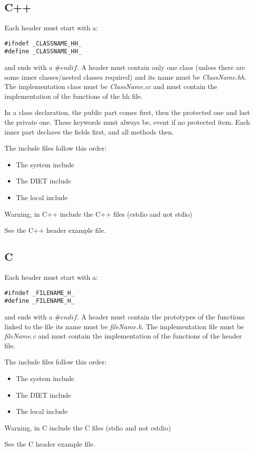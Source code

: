 \documentclass{article}
\begin{document}
\subsection{C++}
Each header must start with a:
\begin{verbatim}
#ifndef _CLASSNAME_HH_ 
#define _CLASSNAME_HH_ 
\end{verbatim}
and ends with a $\#endif$.
A header must contain only one class (unless there are some inner classes/nested
 classes required) and its name must be \textit{ClassName.hh}. The implementation
 class must be \textit{ClassName.cc} and must contain the implementation of the
 functions of the hh file.

In a class declaration, the public part comes first, then the protected one and 
last the private one. These keywords must always be, event if no protected item.
Each inner part declares the fields first, and all methods then.

The include files follow this order:
\begin{itemize}
\item The system include
\item The DIET include
\item The local include
\end{itemize}
Warning, in C++ include the C++ files (cstdio and not stdio)

See the C++ header example file.

\subsection{C}
Each header must start with a:
\begin{verbatim}
#ifndef _FILENAME_H_ 
#define _FILENAME_H_ 
\end{verbatim}
and ends with a $\#endif$.
A header must contain the prototypes of the functions linked to the file
 its name must be \textit{fileName.h}. The implementation
 file must be \textit{fileName.c} and must contain the implementation of the
 functions of the header file.


The include files follow this order:
\begin{itemize}
\item The system include
\item The DIET include
\item The local include
\end{itemize}
Warning, in C include the C files (stdio and not cstdio)

See the C header example file.
\end{document}
